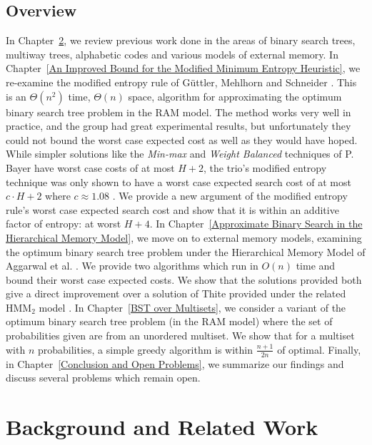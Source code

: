 \documentclass[letterpaper,12pt,titlepage,oneside,final]{book}
\theoremstyle{plain}
\begin{document}
\section{Overview}

In Chapter~\ref{Background and Related Work}, we review previous work done in the areas of binary search trees, multiway trees, alphabetic codes and various models of external memory. In Chapter~\ref{An Improved Bound for the Modified Minimum Entropy Heuristic}, we re-examine the modified entropy rule of G{\"u}ttler, Mehlhorn and Schneider \cite{guttler1980binary}. This is an $\Theta(n^2)$ time, $\Theta(n)$ space, algorithm for approximating the optimum binary search tree problem in the RAM model. The method works very well in practice, and the group had great experimental results, but unfortunately they could not bound the worst case expected cost as well as they would have hoped. While simpler solutions like the \textit{Min-max} and \textit{Weight Balanced} techniques of P. Bayer have worst case costs of at most $H+2$, the trio's modified entropy technique was only shown to have a worst case expected search cost of at most $c\cdot H+2$ where $c \approx 1.08$ \cite{bayer1975improved, guttler1980binary}. We provide a new argument of the modified entropy rule's worst case expected search cost and show that it is within an additive factor of entropy: at worst $H+4$. In Chapter~\ref{Approximate Binary Search in the Hierarchical Memory Model}, we move on to external memory models, examining the optimum binary search tree problem under the Hierarchical Memory Model of Aggarwal et al. \cite{aggarwal1987model}. We provide two algorithms which run in $O(n)$ time and bound their worst case expected costs. We show that the solutions provided both give a direct improvement over a solution of Thite provided under the related HMM$_2$ model \cite{thite2008optimum}. In Chapter~\ref{BST over Multisets}, we consider a variant of the optimum binary search tree problem (in the RAM model) where the set of probabilities given are from an unordered multiset. We show that for a multiset with $n$ probabilities, a simple greedy algorithm is within $\frac{n+1}{2n}$ of optimal. Finally, in Chapter~\ref{Conclusion and Open Problems}, we summarize our findings and discuss several problems which remain open.


\chapter{Background and Related Work} \label{Background and Related Work}
\end{document}
